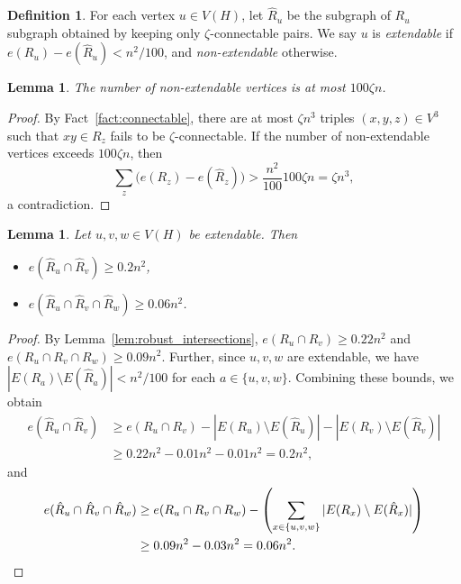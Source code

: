 \documentclass[A4paper,12pt]{article}
\newtheorem{lem}[thm]{Lemma}
\theoremstyle{definition}
\newtheorem{define}[thm]{Definition}
\begin{document}
\begin{define}\label{def:bad}
     For each vertex $u \in V(H)$, let $\hat{R}_u$ be the subgraph of $R_u$ subgraph obtained by keeping only $\zeta$-connectable pairs.  We say $u$ is \emph{extendable} if $e(R_u)-e(\hat{R}_u)< n^2/100$, and \emph{non-extendable} otherwise.
     
\end{define}
\begin{lem}
\label{lem:badvertices}The number of non-extendable vertices is at most $100\zeta n$.
\end{lem}
\begin{proof}
By Fact~\ref{fact:connectable}, there are at most $\zeta n^3$ triples $(x,y,z)\in V^3$ such that $xy\in R_z$ fails to be $\zeta$-connectable. If the number of non-extendable vertices exceeds $100\zeta n$, then
$$
\sum_{z}\big(e(R_z)-e(\hat{R}_z)\big)> \frac{n^2}{100}100 \zeta n=\zeta n^3,
$$
a contradiction.
\end{proof}

\begin{lem} Let $u,v,w\in V(H)$ be extendable. Then 
\begin{itemize}
\item $e(\hat{R}_u \cap \hat{R}_v)\geq 0.2n^2$,
\item $e(\hat{R}_u \cap \hat{R}_v\cap \hat{R}_w)\geq 0.06n^2$.
\end{itemize}
\label{lem:Rhatint}
\end{lem}
\begin{proof}
By Lemma~\ref{lem:robust_intersections}, $e(R_u \cap R_v)\geq 0.22n^2$ and $e(R_u \cap R_v\cap R_w)\geq 0.09n^2$. Further, since $u, v, w$ are extendable, we have $|E(R_a)\setminus E(\hat{R}_a)| < n^2/100$ for each $a \in \{u,v,w\}$.
Combining these bounds, we obtain
\begin{align*}
e(\hat{R}_u \cap \hat{R}_v) &\geq e(R_u \cap R_v)- |E(R_u)\setminus E(\hat{R}_u)| - |E(R_v)\setminus E(\hat{R}_v)| \\
&\geq 0.22n^2-0.01n^2-0.01n^2=0.2n^2,
\end{align*}
and
\begin{align*}
e(\hat{R}_u \cap \hat{R}_v\cap \hat{R}_w) &\geq e(R_u \cap R_v\cap R_w)- \left(\sum_{x \in \{u,v,w\}}|E(R_x)\setminus E(\hat{R}_x)|\right)\\
&\geq 0.09n^2-0.03n^2=0.06n^2. \qedhere
\end{align*}
\end{proof}

\bigskip
\end{document}
